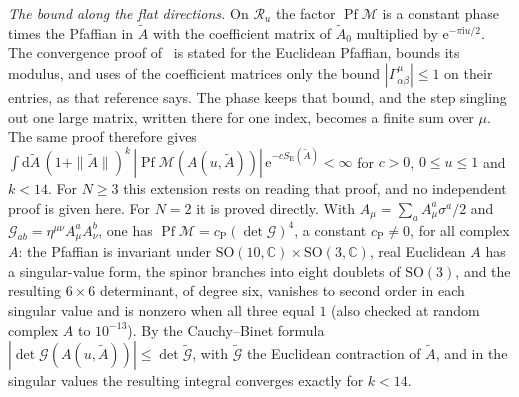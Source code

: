 \emph{The bound along the flat directions.} On \(\mathcal R_u\) the factor \(\operatorname{Pf}\mathcal M\) is a constant phase times the Pfaffian in \(\tilde A\) with the coefficient matrix of \(\tilde A_0\) multiplied by \(\mathrm e^{-\pi\mathrm iu/2}\). The convergence proof of~\cite{AustingWheater2001} is stated for the Euclidean Pfaffian, bounds its modulus, and uses of the coefficient matrices only the bound \(|\Gamma^\mu_{\alpha\beta}|\le1\) on their entries, as that reference says. The phase keeps that bound, and the step singling out one large matrix, written there for one index, becomes a finite sum over \(\mu\). The same proof therefore gives \(\int\mathrm d\tilde A\,(1+\|\tilde A\|)^k\,|\operatorname{Pf}\mathcal M(A(u,\tilde A))|\,\mathrm e^{-cS_{\mathrm E}(\tilde A)}<\infty\) for \(c>0\), \(0\le u\le1\) and \(k<14\). For \(N\ge3\) this extension rests on reading that proof, and no independent proof is given here. For \(N=2\) it is proved directly. With \(A_\mu=\sum_aA_\mu^a\sigma^a/2\) and \(\mathcal G_{ab}=\eta^{\mu\nu}A_\mu^aA_\nu^b\), one has \(\operatorname{Pf}\mathcal M=c_{\mathrm P}(\det\mathcal G)^4\), a constant \(c_{\mathrm P}\neq0\), for all complex \(A\): the Pfaffian is invariant under \(\mathrm{SO}(10,\mathbb C)\times\mathrm{SO}(3,\mathbb C)\), real Euclidean \(A\) has a singular-value form, the spinor branches into eight doublets of \(\mathrm{SO}(3)\), and the resulting \(6\times6\) determinant, of degree six, vanishes to second order in each singular value and is nonzero when all three equal \(1\) (also checked at random complex \(A\) to \(10^{-13}\)). By the Cauchy--Binet formula \(|\det\mathcal G(A(u,\tilde A))|\le\det\tilde{\mathcal G}\), with \(\tilde{\mathcal G}\) the Euclidean contraction of \(\tilde A\), and in the singular values the resulting integral converges exactly for \(k<14\).

